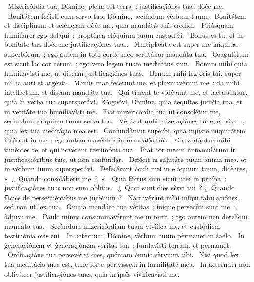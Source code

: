 {~Mizericórdia tua, Dòmine, plena est terra~; justificaçiónes tuas dòċe me. 
~Bonitátem feċìsti cum servo tuo, Dòmine, secùndum vèrbum tuum. 
~Bonitátem et disċiplínam et sciènçiam dòċe me, quia mandátïs tuïs crédidi. 
~Priùsquam humiliárer ego delíqui~; proptèrea elóquium tuum custodívi. 
~Bonus es tu, et in bonitáte tua dòċe me justificaçiónes tuas. 
~Multiplicáta est super me iníquitas superbórum~; ego autem in toto corde meo scrutábor mandáta tua. 
~Coagulátum est sicut lac cor eórum~; ego vero leġem tuam meditátus sum. 
~Bonum mìhi quia humiliavìsti me, ut dìscam justificaçiónes tuas. 
~Bonum mìhi lex oris tui, super mìllia auri et arġènti. 
~Manüs tuae feċérunt me, et plazmavérunt me~; da mìhi intelléctum, et dìscam mandáta tua. 
~Qui tìment te vidébunt me, et laetabùntur, quia in vèrba tua supersperávi. 
~Cognóvi, Dòmine, quia áequitas judìċia tua, et in veritáte tua humiliavìsti me. 
~Fiat mizericórdia tua ut consolétur me, secùndum elóquium tuum servo tuo. 
~Vèniant mìhi mizeraçiónes tuae, et vivam, quia lex tua meditáçio mea est. 
~Confundàntur supèrbi, quia injúste iniquitátem feċérunt in me~; ego autem exerċébor in mandátïs tuïs. 
~Convertàntur mìhi timèntes te, et qui novérunt testimónia tua. 
~Fiat cor meum immaculátum in justificaçiónibus tuïs, ut non confùndar. 
~Deféċit in salutáre tuum ànima mea, et in vèrbum tuum supersperávi. 
~Defeċérunt òculi mei in elóquium tuum, dicèntes, «~¿~Quando consoláberis me~?~». 
~Quia fàctus sum sicut uter in pruína~; justificaçiónes tuas non sum oblítus. 
~¿~Quot sunt dies sèrvi tui~? ¿~Quando fàċies de persequèntibus me judìċium~? 
~Narravérunt mìhi iníqui fabulaçiónes, sed non ut lex tua. 
~Òmnia mandáta tua vèritas~; iníque persecúti sunt me~; àdjuva me. 
~Paulo mìnus consummavérunt me in terra~; ego autem non derelíqui mandáta tua. 
~Secùndum mizericórdiam tuam vivìfica me, et custódiem testimónia oris tui. 
~In aetèrnum, Dòmine, vèrbum tuum pèrmanet in ċaelo. 
~In ġeneraçiónem et ġeneraçiónem vèritas tua~; fundavìsti terram, et pèrmanet. 
~Ordinaçióne tua persevérat dies, quóniam òmnia sèrviunt tìbi. 
~Nisi quod lex tua meditáçio mea est, tunc forte perivìssem in humilitáte mea. 
~In aetèrnum non oblivíscer justificaçiónes tuas, quia in ìpsïs vivificavìsti me. 
}
